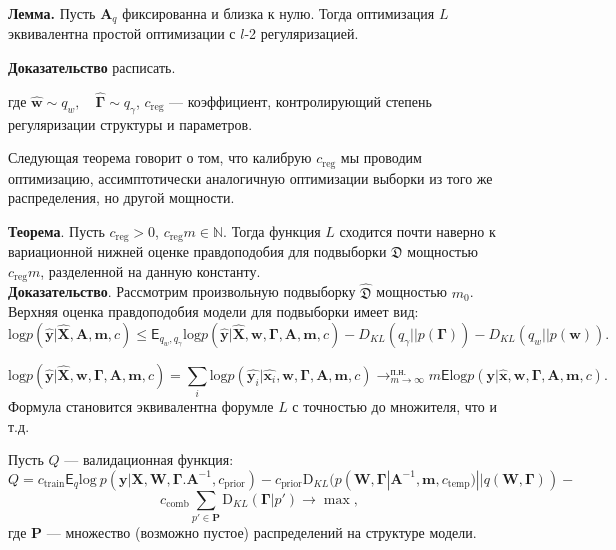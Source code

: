 \documentclass[12pt]{article}
\begin{document}
\textbf{Лемма.}  Пусть $\mathbf{A}_q$ фиксированна и близка к нулю. Тогда оптимизация $L$ эквивалентна простой оптимизации с $l$-2 регуляризацией.

\textbf{Доказательство} расписать.


где $\hat{\mathbf{w}} \sim q_w, \quad \hat{\boldsymbol{\Gamma}} \sim q_\gamma$, $c_{\text{reg}}$ --- коэффициент, контролирующий степень регуляризации структуры и параметров.

Следующая теорема говорит о том, что калибрую $c_{\text{reg}}$ мы проводим оптимизацию, ассимптотически аналогичную оптимизации выборки из того же распределения, но другой мощности.

\textbf{Теорема}. Пусть $c_{\text{reg}} > 0$, $c_{\text{reg}} m \in \mathbb{N}.$
Тогда функция $L$ сходится почти наверно к вариационной нижней оценке правдоподобия для подвыборки  $\mathfrak{D}$ 
мощностью $c_{\text{reg}} m$, разделенной на данную константу.\\

\textbf{Доказательство}. Рассмотрим произвольную подвыборку $\hat{\mathfrak{D}}$ мощностью $m_0$. Верхняя оценка правдоподобия модели для подвыборки имеет вид:
\[
 \text{log} p(\hat{\mathbf{y}}|\hat{\mathbf{X}},\mathbf{A},\mathbf{m}, c)  \leq \mathsf{E}_{q_w,q_\gamma}\text{log} p(\hat{\mathbf{y}}|\hat{\mathbf{X}},\mathbf{w}, \boldsymbol{\Gamma}, \mathbf{A},\mathbf{m}, c) - {D_{KL}}(q_\gamma||p(\boldsymbol{\Gamma})) - {D_{KL}}(q_{w}||p(\mathbf{w})).
\]

\[
\text{log} p(\hat{\mathbf{y}}|\hat{\mathbf{X}},\mathbf{w}, \boldsymbol{\Gamma}, \mathbf{A},\mathbf{m}, c) = \sum_i \text{log} p(\hat{\mathbf{y}_i}|\hat{\mathbf{x}_i},\mathbf{w}, \boldsymbol{\Gamma}, \mathbf{A},\mathbf{m}, c) \to^{\text{п.н.}}_{m \to \infty} m\mathsf{E}\text{log} p(\mathbf{y}|\hat{\mathbf{x}},\mathbf{w}, \boldsymbol{\Gamma}, \mathbf{A},\mathbf{m}, c).
\]
Формула становится эквивалентна форумле $L$ с точностью до множителя, что и т.д.

Пусть $Q$ --- валидационная функция:
\[
Q = {c_\text{train}\mathsf{E}_q \text{log}~{p(\mathbf{y} | \mathbf{X}, \mathbf{W}, \boldsymbol{\Gamma}. \mathbf{A}^{-1}, c_{\text{prior}})}}
 - {c_\text{prior}\text{D}_{KL}(p(\mathbf{W}, \boldsymbol{\Gamma} |\mathbf{A}^{-1}, \mathbf{m}, c_{\text{temp}}) || q(\mathbf{W}, \boldsymbol{\Gamma}))} -\]
\[
{c_{\text{comb}}\sum_{p' \in \mathbf{P}} \text{D}_{KL}(\boldsymbol{\Gamma} | p')} \to \max, 
\]
где $\mathbf{P}$ --- множество (возможно пустое) распределений на структуре модели.
\end{document}
